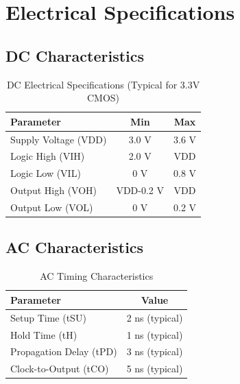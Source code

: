 \documentclass[12pt,a4paper]{article}
\begin{document}
\section{Electrical Specifications}

\subsection{DC Characteristics}

\begin{table}[H]
    \centering
    \begin{tabular}{|l|c|c|}
        \hline
        \textbf{Parameter} & \textbf{Min} & \textbf{Max} \\
        \hline
        Supply Voltage (VDD) & 3.0 V & 3.6 V \\
        Logic High (VIH) & 2.0 V & VDD \\
        Logic Low (VIL) & 0 V & 0.8 V \\
        Output High (VOH) & VDD-0.2 V & VDD \\
        Output Low (VOL) & 0 V & 0.2 V \\
        \hline
    \end{tabular}
    \caption{DC Electrical Specifications (Typical for 3.3V CMOS)}
\end{table}

\subsection{AC Characteristics}

\begin{table}[H]
    \centering
    \begin{tabular}{|l|c|}
        \hline
        \textbf{Parameter} & \textbf{Value} \\
        \hline
        Setup Time (tSU) & 2 ns (typical) \\
        Hold Time (tH) & 1 ns (typical) \\
        Propagation Delay (tPD) & 3 ns (typical) \\
        Clock-to-Output (tCO) & 5 ns (typical) \\
        \hline
    \end{tabular}
    \caption{AC Timing Characteristics}
\end{table}

\end{document}
